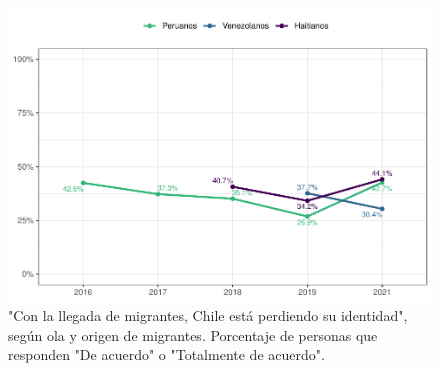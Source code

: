 \documentclass[
  12pt,
]{book}
\begin{document}
\begin{figure}

{\centering \includegraphics{reporte-elsoc_files/figure-latex/amen2-wave-1} 

}

\caption{"Con la llegada de migrantes, Chile está perdiendo su identidad", según ola y origen de migrantes. Porcentaje de personas que responden "De acuerdo" o "Totalmente de acuerdo".}\label{fig:amen2-wave}
\end{figure}
\end{document}
